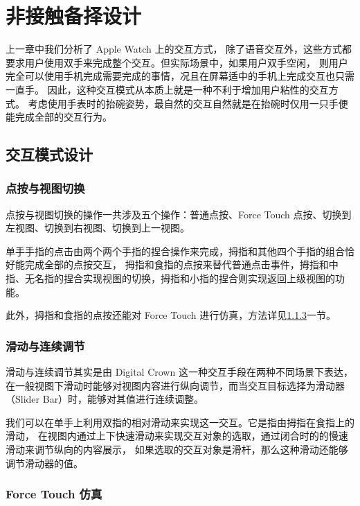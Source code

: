\chapter{非接触备择设计}

\quad\quad 上一章中我们分析了 Apple Watch 上的交互方式，
除了语音交互外，这些方式都要求用户使用双手来完成整个交互。但实际场景中，如果用户双手空闲，
则用户完全可以使用手机完成需要完成的事情，况且在屏幕适中的手机上完成交互也只需一直手。
因此，这种交互模式从本质上就是一种不利于增加用户粘性的交互方式。
考虑使用手表时的抬碗姿势，最自然的交互自然就是在抬碗时仅用一只手便能完成全部的交互行为。

\section{交互模式设计}

\subsection{点按与视图切换}

点按与视图切换的操作一共涉及五个操作：普通点按、Force Touch 点按、切换到左视图、切换到右视图、切换到上一视图。

单手手指的点击由两个两个手指的捏合操作来完成，拇指和其他四个手指的组合恰好能完成全部的点按交互，
拇指和食指的点按来替代普通点击事件，拇指和中指、无名指的捏合实现视图的切换，拇指和小指的捏合则实现返回上级视图的功能。

此外，拇指和食指的点按还能对 Force Touch 进行仿真，方法详见\ref{sub:force-touch-simu}一节。

\subsection{滑动与连续调节}

滑动与连续调节其实是由 Digital Crown 这一种交互手段在两种不同场景下表达，
在一般视图下滑动时能够对视图内容进行纵向调节，而当交互目标选择为滑动器（Slider Bar）时，能够对其值进行连续调整。

我们可以在单手上利用双指的相对滑动来实现这一交互。它是指由拇指在食指上的滑动，
在视图内通过上下快速滑动来实现交互对象的选取，通过闭合时的的慢速滑动来调节纵向的内容展示，
如果选取的交互对象是滑杆，那么这种滑动还能够调节滑动器的值。

\subsection{Force Touch 仿真}
\label{sub:force-touch-simu}

